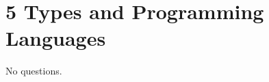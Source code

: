 \documentclass[13pt, a4paper]{article}
\begin{document}
\section*{5 Types and Programming Languages}

No questions.
\end{document}
